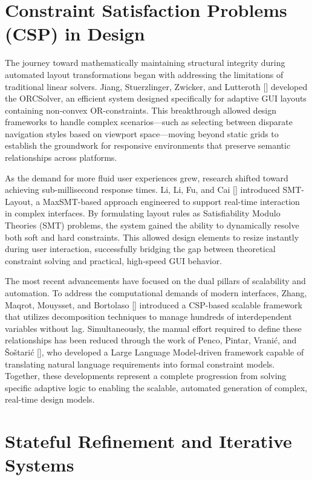 \begin{refsection}
\section{Constraint Satisfaction Problems (CSP) in Design}
The journey toward mathematically maintaining structural integrity during automated layout transformations began with addressing the limitations of traditional linear solvers. Jiang, Stuerzlinger, Zwicker, and Lutteroth [\citeyear{Jiang2020ORCSolver}] developed the ORCSolver, an efficient system designed specifically for adaptive GUI layouts containing non-convex OR-constraints. This breakthrough allowed design frameworks to handle complex scenarios—such as selecting between disparate navigation styles based on viewport space—moving beyond static grids to establish the groundwork for responsive environments that preserve semantic relationships across platforms.

As the demand for more fluid user experiences grew, research shifted toward achieving sub-millisecond response times. Li, Li, Fu, and Cai [\citeyear{Li2024SMT}] introduced SMT-Layout, a MaxSMT-based approach engineered to support real-time interaction in complex interfaces. By formulating layout rules as Satisfiability Modulo Theories (SMT) problems, the system gained the ability to dynamically resolve both soft and hard constraints. This allowed design elements to resize instantly during user interaction, successfully bridging the gap between theoretical constraint solving and practical, high-speed GUI behavior.

The most recent advancements have focused on the dual pillars of scalability and automation. To address the computational demands of modern interfaces, Zhang, Maqrot, Mouysset, and Bortolaso [\citeyear{Zhang2025Scalable}] introduced a CSP-based scalable framework that utilizes decomposition techniques to manage hundreds of interdependent variables without lag. Simultaneously, the manual effort required to define these relationships has been reduced through the work of Penco, Pintar, Vranić, and Šoštarić [\citeyear{Penko2025LLM}], who developed a Large Language Model-driven framework capable of translating natural language requirements into formal constraint models. Together, these developments represent a complete progression from solving specific adaptive logic to enabling the scalable, automated generation of complex, real-time design models.


\section{Stateful Refinement and Iterative Systems}


\end{refsection}
